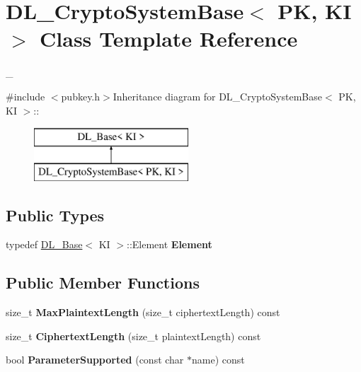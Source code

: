\hypertarget{class_d_l___crypto_system_base}{
\section{DL\_\-CryptoSystemBase$<$ PK, KI $>$ Class Template Reference}
\label{class_d_l___crypto_system_base}
}


\_\-  


{\ttfamily \#include $<$pubkey.h$>$}Inheritance diagram for DL\_\-CryptoSystemBase$<$ PK, KI $>$::\begin{figure}[H]
\begin{center}
\leavevmode
\includegraphics[height=2cm]{class_d_l___crypto_system_base}
\end{center}
\end{figure}
\subsection*{Public Types}
\begin{DoxyCompactItemize}
\item 
\hypertarget{class_d_l___crypto_system_base_a5f876e43ea832090acbe7405f995932f}{
typedef \hyperlink{class_d_l___base}{DL\_\-Base}$<$ KI $>$::Element {\bfseries Element}}
\label{class_d_l___crypto_system_base_a5f876e43ea832090acbe7405f995932f}

\end{DoxyCompactItemize}
\subsection*{Public Member Functions}
\begin{DoxyCompactItemize}
\item 
\hypertarget{class_d_l___crypto_system_base_a3deffe3347f225eb0483c7bf3bedc495}{
size\_\-t {\bfseries MaxPlaintextLength} (size\_\-t ciphertextLength) const }
\label{class_d_l___crypto_system_base_a3deffe3347f225eb0483c7bf3bedc495}

\item 
\hypertarget{class_d_l___crypto_system_base_ac738aee0b0262899ad33379da8798c6a}{
size\_\-t {\bfseries CiphertextLength} (size\_\-t plaintextLength) const }
\label{class_d_l___crypto_system_base_ac738aee0b0262899ad33379da8798c6a}

\item 
\hypertarget{class_d_l___crypto_system_base_ac510f55af473e85547237fdb39e441e1}{
bool {\bfseries ParameterSupported} (const char $\ast$name) const }
\label{class_d_l___crypto_system_base_ac510f55af473e85547237fdb39e441e1}

\end{DoxyCompactItemize}
